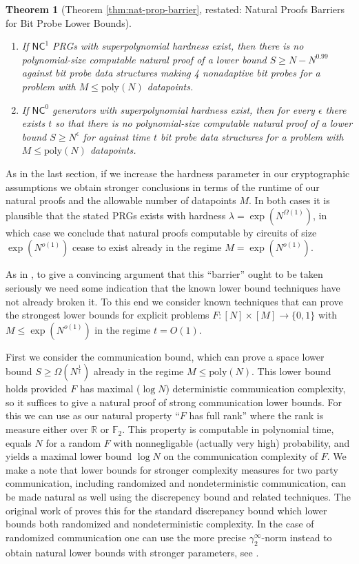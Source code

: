 \documentclass[11pt]{article}
\newtheorem*{theorem*}{Theorem}
\newcommand{\B}{\{0,1\}}
\newcommand{\poly}{\mathrm{poly}}
\begin{document}
\begin{theorem*}[Theorem \ref{thm:nat-prop-barrier}, restated: Natural Proofs Barriers for Bit Probe Lower Bounds]
~\begin{enumerate}
    \item If $\mathsf{NC}^1$ PRGs with superpolynomial hardness exist, then there is no polynomial-size computable natural proof of a lower bound $S \geq N - N^{0.99}$ against bit probe data structures making 4 nonadaptive bit probes for a problem with $M \leq \poly(N)$ datapoints.
    \item If $\mathsf{NC}^0$ generators with superpolynomial hardness exist, then for every $\epsilon$ there exists $t$ so that there is no polynomial-size computable natural proof of a lower bound $S \geq N^\epsilon$ for against time $t$ bit probe data structures for a problem with $M \leq \poly(N)$ datapoints.
\end{enumerate}
\end{theorem*}
As in the last section, if we increase the hardness parameter in our cryptographic assumptions we obtain stronger conclusions in terms of the runtime of our natural proofs and the allowable number of datapoints $M$. In both cases it is plausible that the stated PRGs exists with hardness $\lambda = \exp(N^{\Omega(1)})$, in which case we conclude that natural proofs computable by circuits of size $\exp(N^{o(1)})$ cease to exist already in the regime $M = \exp(N^{o(1)})$.

As in \cite{natural-proofs}, to give a convincing argument that this ``barrier'' ought to be taken seriously we need some indication that the known lower bound techniques have not already broken it. To this end we consider known techniques that can prove the strongest lower bounds for explicit problems $F: [N] \times [M] \to \B$ with $M \leq \exp(N^{o(1)})$ in the regime $t = O(1)$. 

First we consider the communication bound, which can prove a space lower bound $S \geq \Omega(N^{\frac{1}{t}})$ already in the regime $M \leq \poly(N)$. This lower bound holds provided $F$ has maximal ($\log N$) deterministic communication complexity, so it suffices to give a natural proof of strong communication lower bounds. For this we can use as our natural property ``$F$ has full rank'' where the rank is measure either over $\mathbb{R}$ or $\mathbb{F}_2$. This property is computable in polynomial time, equals $N$ for a random $F$ with nonnegligable (actually very high) probability, and yields a maximal lower bound $\log N$ on the communication complexity of $F$. We make a note that lower bounds for stronger complexity measures for two party communication, including randomized and nondeterministic communication, can be made natural as well using the discrepency bound and related techniques. The original work of \cite{natural-proofs} proves this for the standard discrepancy bound which lower bounds both randomized and nondeterministic complexity. In the case of randomized communication one can use the more precise $\gamma_2^\infty$-norm instead to obtain natural lower bounds with stronger parameters, see \cite{linial2007lower}.
\end{document}
